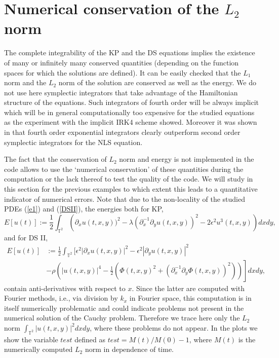 \documentclass[final]{siamltex}
\begin{document}
\section{Numerical conservation of the $L_{2}$ norm}
The complete integrability of the KP and the DS equations implies the 
existence of many or infinitely many conserved quantities (depending 
on the function spaces for which the solutions are defined). It can 
be easily checked that the $L_{1}$ norm and the $L_{2}$ norm of the 
solution are conserved as well as the energy. We do not use here 
symplectic integrators that take advantage of the Hamiltonian 
structure of the equations. Such integrators of fourth order will be 
always implicit which will be in general computationally too expensive for the 
studied equations as the experiment with the implicit IRK4 scheme showed. 
Moreover it was shown in \cite{BIS} that fourth order exponential 
integrators clearly outperform second order symplectic integrators 
for the NLS equation. 

The fact that the conservation of $L_{2}$ norm and energy is not 
implemented in the code allows to use the `numerical conservation' of 
these quantities during the computation or 
the lack thereof to test the quality of the 
code. We will study in this section for the previous examples to 
which extent this leads to a quantitative 
indicator of numerical errors. Note that due to the non-locality of 
the studied PDEs (\ref{e1}) and (\ref{DSII}), the energies both for KP,
$$
   E[u(t)]:= \frac{1}{2} \int_{\mathbb{T}^2} \left(\partial_x u(t,x,y))^2 - \lambda 
   (\partial_x^{-1} \partial_y u(t,x,y))^2 - 2\epsilon^2 u^3(t,x,y) 
   \right)
   d x d y,$$
and for DS II,
\begin{align}
    E[u(t)] & := \frac{1}{2} \int_{\mathbb{T}^2} \bigg[ \epsilon^{2}|\partial_x u(t,x,y)|^2 - 
\epsilon^{2}|\partial_y u(t,x,y)|^2     \nonumber\\
& \left.-\rho\left(|u(t,x,y)|^{4}-\frac{1}{2}\left(\Phi(t,x,y)^{2}+(\partial_{x}^{-1}\partial_{y}\Phi(t,x,y))^{2}\right)\right) 
  \right] d x d y,
    \nonumber
\end{align}
contain anti-derivatives with respect to $x$. Since the latter are 
computed with Fourier methods, i.e., via division by  $k_{x}$ in 
Fourier space, this 
computation is in itself numerically problematic and could indicate 
problems not present in the numerical solution of the Cauchy problem. Therefore we trace 
here only the $L_{2}$ norm $\int_{\mathbb{T}^2}|u(t,x,y)|^{2}dxdy $, 
where these problems do not appear.  In the plots we show the 
variable $test$ defined as $test=M(t)/M(0)-1$, where $M(t)$ is the 
numerically computed $L_{2}$ norm in dependence of time.
\end{document}

